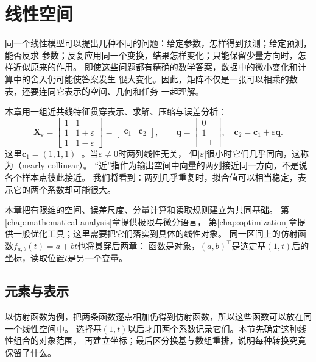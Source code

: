 \chapter{线性空间}
\label{chap:linear-algebra-and-matrix-analysis}
\label{chap:linear-algebra}
\label{chap:matrix-analysis}

同一个线性模型可以提出几种不同的问题：给定参数，怎样得到预测；给定预测，能否反求
参数；反复应用同一个变换，结果怎样变化；只能保留少量方向时，怎样近似原来的作用。
即使这些问题都有精确的数学答案，数据中的微小变化和计算中的舍入仍可能使答案发生
很大变化。因此，矩阵不仅是一张可以相乘的数表，还要连同它表示的空间、几何和任务
一起理解。

本章用一组近共线特征贯穿表示、求解、压缩与误差分析：
\begin{equation}
 \bm X_{\varepsilon}
 =\begin{bmatrix}1&1\\1&1+\varepsilon\\1&1-\varepsilon\end{bmatrix}
 =\begin{bmatrix}\bm c_1&\bm c_2\end{bmatrix},
 \qquad
 \bm q=\begin{bmatrix}0\\1\\-1\end{bmatrix},
 \quad \bm c_2=\bm c_1+\varepsilon\bm q.
 \label{eq:linear-algebra-nearly-collinear-design}
\end{equation}
这里$\bm c_1=(1,1,1)^{\top}$。当$\varepsilon\neq0$时两列线性无关，
但$|\varepsilon|$很小时它们几乎同向，这称为（nearly collinear）。
“近”指作为输出空间中向量的两列接近同一方向，不是说各个样本点彼此接近。
我们将看到：两列几乎重复时，拟合值可以相当稳定，表示它的两个系数却可能很大。


本章把有限维的空间、误差尺度、分量计算和读取规则建立为共同基础。
第\ref{chap:mathematical-analysis}章提供极限与微分语言，
第\ref{chap:optimization}章提供一般优化工具；这里需要把它们落实到具体的线性对象。
同一区间上的仿射函数$f_{a,b}(t)=a+bt$也将贯穿后两章：
函数是对象，$(a,b)^\top$是选定基$(1,t)$后的坐标，读取位置$t$是另一个变量。
\section{元素与表示}
\label{sec:linear-algebra-space-representations}
\label{sec:linear-algebra-vector-spaces-coordinates}


以仿射函数为例，把两条函数逐点相加仍得到仿射函数，所以这些函数可以放在同一个线性空间中。
选择基$(1,t)$以后才用两个系数记录它们。本节先确定这种线性组合的对象范围，
再建立坐标；最后区分换基与数组重排，说明每种转换究竟保留了什么。

